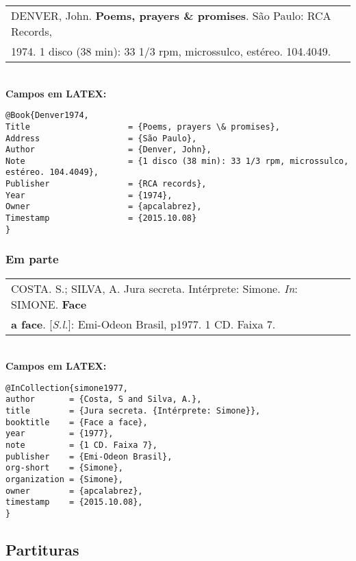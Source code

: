 \begin{tabular}{|l|c|} \hline
	DENVER, John. \textbf{Poems, prayers \& promises}. São Paulo: RCA Records,\\
	1974. 1 disco (38 min): 33 1/3 rpm, microssulco, estéreo. 104.4049. \\\hline
\end{tabular} \\

\textbf{Campos em LATEX:} 

\begin{verbatim}
@Book{Denver1974,
Title                    = {Poems, prayers \& promises},
Address                  = {São Paulo},
Author                   = {Denver, John},
Note                     = {1 disco (38 min): 33 1/3 rpm, microssulco, 
estéreo. 104.4049},
Publisher                = {RCA records},
Year                     = {1974},
Owner                    = {apcalabrez},
Timestamp                = {2015.10.08}
}
\end{verbatim}

\subsubsection{Em parte}

\begin{tabular}{|l|c|} \hline
	COSTA. S.; SILVA, A. Jura secreta. Intérprete: Simone. \textit{In}: SIMONE. \textbf{Face}\\ \textbf{a face}. [\textit{S.l.}]: Emi-Odeon Brasil, p1977. 1 CD. Faixa 7. 
	\\\hline
\end{tabular} \\

\textbf{Campos em LATEX:} 

\begin{verbatim}
@InCollection{simone1977,
author       = {Costa, S and Silva, A.},
title        = {Jura secreta. {Intérprete: Simone}},
booktitle    = {Face a face},
year         = {1977},
note         = {1 CD. Faixa 7},
publisher    = {Emi-Odeon Brasil},
org-short    = {Simone},
organization = {Simone},
owner        = {apcalabrez},
timestamp    = {2015.10.08},
}
\end{verbatim}

\subsection{Partituras}

